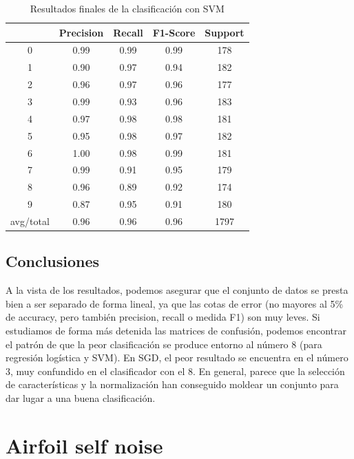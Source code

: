 \begin{table}[H]
	\centering
	\begin{tabular}{|c|c|c|c|c|}
		\hline
		& Precision & Recall & F1-Score & Support \\ \hline
		0         & 0.99      & 0.99   & 0.99     & 178     \\ \hline
		1         & 0.90      & 0.97   & 0.94     & 182     \\ \hline
		2         & 0.96      & 0.97   & 0.96     & 177     \\ \hline
		3         & 0.99      & 0.93   & 0.96     & 183     \\ \hline
		4         & 0.97      & 0.98   & 0.98     & 181     \\ \hline
		5         & 0.95      & 0.98   & 0.97     & 182     \\ \hline
		6         & 1.00      & 0.98   & 0.99     & 181     \\ \hline
		7         & 0.99      & 0.91   & 0.95     & 179     \\ \hline
		8         & 0.96      & 0.89   & 0.92     & 174     \\ \hline
		9         & 0.87      & 0.95   & 0.91     & 180     \\ \hline
		avg/total & 0.96      & 0.96   & 0.96     & 1797    \\ \hline
	\end{tabular}
	\caption{Resultados finales de la clasificación con SVM}
\end{table}

\subsection{Conclusiones}

A la vista de los resultados, podemos asegurar que el conjunto de datos se presta bien a ser separado de forma lineal, ya que las cotas de error (no mayores al 5\% de accuracy, pero también precision, recall o medida F1) son muy leves. Si estudiamos de forma más detenida las matrices de confusión, podemos encontrar el patrón de que la peor clasificación se produce entorno al número 8 (para regresión logística y SVM). En SGD, el peor resultado se encuentra en el número 3, muy confundido en el clasificador con el 8. En general, parece que la selección de características y la normalización han conseguido moldear un conjunto para dar lugar a una buena clasificación.

\newpage 
\section{Airfoil self noise}

